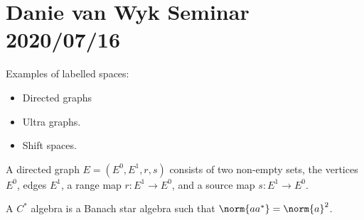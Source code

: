 \section{Danie van Wyk Seminar 2020/07/16}
    Examples of labelled spaces:
    \begin{itemize}
        \item Directed graphs
        \item Ultra graphs.
        \item Shift spaces.
    \end{itemize}
    \begin{definition}
        A directed graph $E=(E^{0},E^{1},r,s)$ consists of two non-empty sets,
        the vertices $E^{0}$, edges $E^{1}$, a range map
        $r:E^{1}\rightarrow{E}^{0}$, and a source map $s:E^{1}\rightarrow{E}^{0}$.
    \end{definition}
    \begin{definition}
        A $C^{*}$ algebra is a Banach star algebra such that
        $\norm{aa^{*}}=\norm{a}^{2}$.
    \end{definition}
